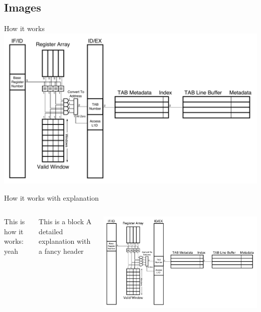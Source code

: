 \documentclass{beamer}
\begin{document}
\subsection{Images}
\begin{frame}{How it works}
   \includegraphics[width=\textwidth]{figures/tabhardware.pdf}
\end{frame}
\begin{frame}{How it works with explanation}
   \begin{columns} %
      This is how it works: yeah
      \begin{block}{This is a block}
      A detailed explanation with a fancy header
      \end{block}
      \includegraphics[width=\textwidth]{figures/tabhardware.pdf}
   \end{columns}
\end{frame}
\end{document}
